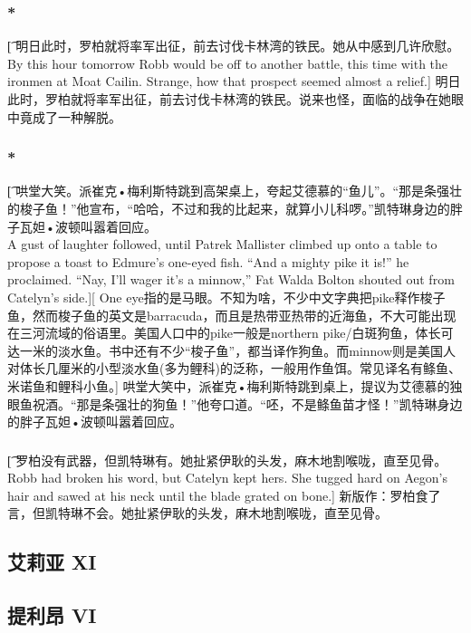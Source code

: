 \documentclass[12pt,a4paper]{article}
\begin{document}
\subsubsection{\color{red}*}\t[
	明日此时，罗柏就将率军出征，前去讨伐卡林湾的铁民。她从中感到几许欣慰。\\
	By this hour tomorrow Robb would be off to another battle, this time with the ironmen at Moat Cailin. Strange, how that prospect seemed almost a relief.]
	明日此时，罗柏就将率军出征，前去讨伐卡林湾的铁民。说来也怪，面临的战争在她眼中竟成了一种解脱。
	
\subsubsection{\color{red}*}\t[
	哄堂大笑。派崔克•梅利斯特跳到高架桌上，夸起艾德慕的“鱼儿”。“那是条强壮的梭子鱼！”他宣布，“哈哈，不过和我的比起来，就算小儿科啰。”凯特琳身边的胖子瓦妲•波顿叫嚣着回应。\\
	A gust of laughter followed, until Patrek Mallister climbed up onto a table to propose a toast to Edmure's one-eyed fish. “And a mighty pike it is!” he proclaimed. “Nay, I'll wager it's a minnow,” Fat Walda Bolton shouted out from Catelyn's side.][
	One eye指的是马眼。不知为啥，不少中文字典把pike释作梭子鱼，然而梭子鱼的英文是barracuda，而且是热带亚热带的近海鱼，不大可能出现在三河流域的俗语里。美国人口中的pike一般是northern pike/白斑狗鱼，体长可达一米的淡水鱼。书中还有不少“梭子鱼”，都当译作狗鱼。而minnow则是美国人对体长几厘米的小型淡水鱼(多为鲤科)的泛称，一般用作鱼饵。常见译名有鲦鱼、米诺鱼和鲤科小鱼。]
	哄堂大笑中，派崔克•梅利斯特跳到桌上，提议为艾德慕的独眼鱼祝酒。“那是条强壮的狗鱼！”他夸口道。“呸，不是鲦鱼苗才怪！”凯特琳身边的胖子瓦妲•波顿叫嚣着回应。
	
\subsubsection{}\t[
	罗柏没有武器，但凯特琳有。她扯紧伊耿的头发，麻木地割喉咙，直至见骨。\\
	Robb had broken his word, but Catelyn kept hers. She tugged hard on Aegon's hair and sawed at his neck until the blade grated on bone.]
	新版作：罗柏食了言，但凯特琳不会。她扯紧伊耿的头发，麻木地割喉咙，直至见骨。
	
\subsection{艾莉亚 XI}
	
\subsection{提利昂 VI}
\end{document}
